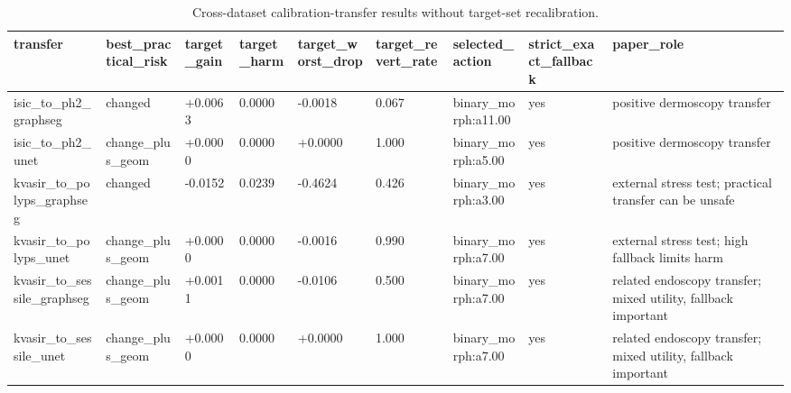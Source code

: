 \begin{table}[t]
\centering
\small
\caption{Cross-dataset calibration-transfer results without target-set recalibration.}
\label{tab:cross_dataset_transfer}
\begin{tabular}{lllllllll}
\toprule
transfer & best\_practical\_risk & target\_gain & target\_harm & target\_worst\_drop & target\_revert\_rate & selected\_action & strict\_exact\_fallback & paper\_role \\
\midrule
isic\_to\_ph2\_graphseg & changed & +0.0063 & 0.0000 & -0.0018 & 0.067 & binary\_morph:a11.00 & yes & positive dermoscopy transfer \\
isic\_to\_ph2\_unet & change\_plus\_geom & +0.0000 & 0.0000 & +0.0000 & 1.000 & binary\_morph:a5.00 & yes & positive dermoscopy transfer \\
kvasir\_to\_polyps\_graphseg & changed & -0.0152 & 0.0239 & -0.4624 & 0.426 & binary\_morph:a3.00 & yes & external stress test; practical transfer can be unsafe \\
kvasir\_to\_polyps\_unet & change\_plus\_geom & +0.0000 & 0.0000 & -0.0016 & 0.990 & binary\_morph:a7.00 & yes & external stress test; high fallback limits harm \\
kvasir\_to\_sessile\_graphseg & change\_plus\_geom & +0.0011 & 0.0000 & -0.0106 & 0.500 & binary\_morph:a7.00 & yes & related endoscopy transfer; mixed utility, fallback important \\
kvasir\_to\_sessile\_unet & change\_plus\_geom & +0.0000 & 0.0000 & +0.0000 & 1.000 & binary\_morph:a7.00 & yes & related endoscopy transfer; mixed utility, fallback important \\
\bottomrule
\end{tabular}
\end{table}
